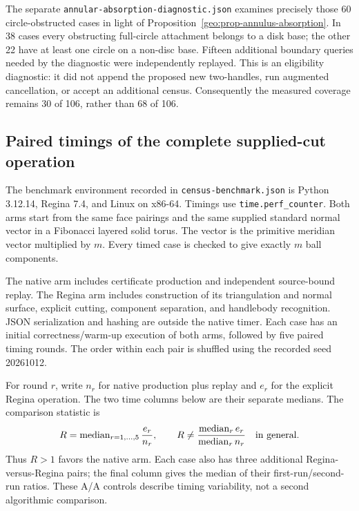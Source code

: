 The separate \texttt{annular-absorption-diagnostic.json} examines precisely
those 60 circle-obstructed cases in light of
Proposition~\ref{geo:prop-annulus-absorption}.  In 38 cases every obstructing
full-circle attachment belongs to a disk base; the other 22 have at least
one circle on a non-disc base.  Fifteen additional boundary queries needed
by the diagnostic were independently replayed.  This is an eligibility
diagnostic: it did not append the proposed new two-handles, run augmented
cancellation, or accept an additional census.  Consequently the measured
coverage remains 30 of 106, rather than 68 of 106.

\subsection{Paired timings of the complete supplied-cut operation}
\label{main:exp-timing}

The benchmark environment recorded in \texttt{census-benchmark.json} is
Python 3.12.14, Regina 7.4, and Linux on x86-64.  Timings use
\texttt{time.perf\_counter}.  Both arms start from the same face pairings and
the same supplied standard normal vector in a Fibonacci layered solid torus.
The vector is the primitive meridian vector multiplied by $m$.  Every timed
case is checked to give exactly $m$ ball components.

The native arm includes certificate production and independent source-bound
replay.  The Regina arm includes construction of its triangulation and normal
surface, explicit cutting, component separation, and handlebody recognition.
JSON serialization and hashing are outside the native timer.  Each case has
an initial correctness/warm-up execution of both arms, followed by five
paired timing rounds.  The order within each pair is shuffled using the
recorded seed 20261012.

For round $r$, write $n_r$ for native production plus replay and $e_r$ for the
explicit Regina operation.  The two time columns below are their separate
medians.  The comparison statistic is
\[
 R=\operatorname{median}_{r=1,\ldots,5}\frac{e_r}{n_r},
 \qquad
 R\ne
 \frac{\operatorname{median}_r e_r}{\operatorname{median}_r n_r}
 \quad\hbox{in general}.
\]
Thus $R>1$ favors the native arm.  Each case also has three additional
Regina-versus-Regina pairs; the final column gives the median of their
first-run/second-run ratios.  These A/A controls describe timing variability,
not a second algorithmic comparison.


